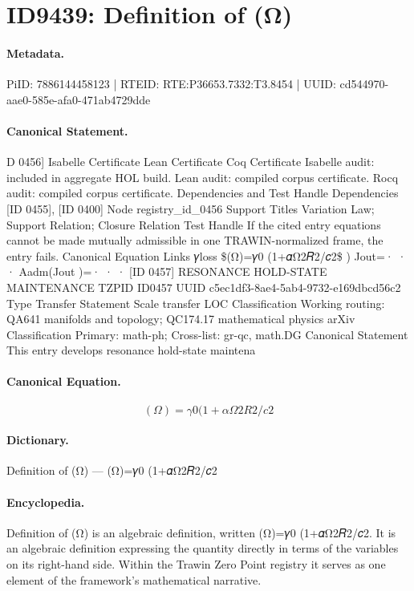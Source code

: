 \section*{ID9439: Definition of (Ω)}
\paragraph{Metadata.}
PiID: 7886144458123 | RTEID: RTE:P36653.7332:T3.8454 | UUID: cd544970-aae0-585e-afa0-471ab4729dde

\paragraph{Canonical Statement.}
D 0456] Isabelle Certificate Lean Certificate Coq Certificate Isabelle audit: included in aggregate HOL build. Lean audit: compiled corpus certificate. Rocq audit: compiled corpus certificate. Dependencies and Test Handle Dependencies [ID 0455], [ID 0400] Node registry\_id\_0456 Support Titles Variation Law; Support Relation; Closure Relation Test Handle If the cited entry equations cannot be made mutually admissible in one TRAWIN-normalized frame, the entry fails. Canonical Equation Links 𝛾loss \$(Ω)=𝛾0 (1+𝛼Ω2𝑅2/𝑐2\$ ) Jout=· · · Aadm(Jout )=· · · [ID 0457] RESONANCE HOLD-STATE MAINTENANCE TZPID ID0457 UUID c5ec1df3-8ae4-5ab4-9732-e169dbcd56c2 Type Transfer Statement Scale transfer LOC Classification Working routing: QA641 manifolds and topology; QC174.17 mathematical physics arXiv Classification Primary: math-ph; Cross-list: gr-qc, math.DG Canonical Statement This entry develops resonance hold-state maintena

\paragraph{Canonical Equation.}
\[
(Ω)=𝛾0 (1+𝛼Ω2𝑅2/𝑐2
\]

\paragraph{Dictionary.}
Definition of (Ω) — (Ω)=𝛾0 (1+𝛼Ω2𝑅2/𝑐2

\paragraph{Encyclopedia.}
Definition of (Ω) is an algebraic definition, written (Ω)=𝛾0 (1+𝛼Ω2𝑅2/𝑐2. It is an algebraic definition expressing the quantity directly in terms of the variables on its right-hand side. Within the Trawin Zero Point registry it serves as one element of the framework's mathematical narrative.
